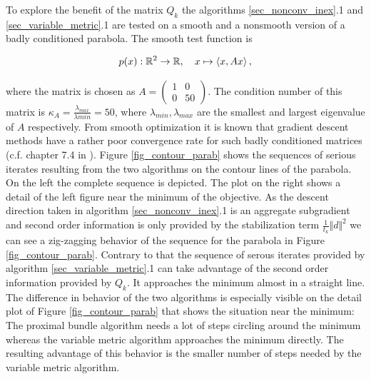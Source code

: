 
To explore the benefit of the matrix \(Q_k\) the algorithms \ref{sec_nonconv_inex}.1 and \ref{sec_variable_metric}.1 are tested on a smooth and a nonsmooth version of a badly conditioned parabola.
The smooth test function is

\[p(x): \mathbb{R}^2 \to \mathbb{R}, \quad x \mapsto \left\langle x, Ax \right\rangle,\]

where the matrix is chosen as \(A = \begin{pmatrix} 1&0 \\ 0&50\end{pmatrix}\). The condition number of this matrix is \(\kappa_A = \frac{\lambda_{max}}{\lambda{min}} = 50\), where \(\lambda_{min}, \lambda_{max}\) are the smallest and largest eigenvalue of \(A\) respectively. From smooth optimization it is known that gradient descent methods have a rather poor convergence rate for such badly conditioned matrices (c.f. chapter 7.4 in \cite{Ulbrich2012}).
Figure \ref{fig_contour_parab} shows the sequences of serious iterates resulting from the two algorithms on the contour lines of the parabola. On the left the complete sequence is depicted. The plot on the right shows a detail of the left figure near the minimum of the objective.
As the descent direction taken in algorithm \ref{sec_nonconv_inex}.1 is an aggregate subgradient and second order information is only provided by the stabilization term \(\frac{1}{t_k}\Vert d\Vert^2\) we can see a zig-zagging behavior of the sequence for the parabola in Figure \ref{fig_contour_parab}.
Contrary to that the sequence of serous iterates provided by algorithm \ref{sec_variable_metric}.1 can take advantage of the second order information provided by \(Q_k\).
It approaches the minimum almost in a straight line. The difference in behavior of the two algorithms is especially visible on the detail plot of Figure \ref{fig_contour_parab} that shows the situation near the minimum: The proximal bundle algorithm needs a lot of steps circling around the minimum whereas the variable metric algorithm approaches the minimum directly. The resulting advantage of this behavior is the smaller number of steps needed by the variable metric algorithm. 



